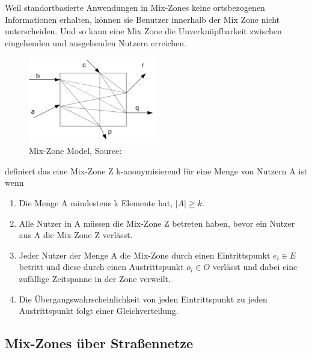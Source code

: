 Weil standortbasierte Anwendungen in Mix-Zones keine ortsbezogenen Informationen erhalten, können sie Benutzer innerhalb der Mix Zone nicht unterscheiden. Und so kann eine Mix Zone die Unverknüpfbarkeit zwischen  eingehenden und ausgehenden Nutzern erreichen.

\begin{figure}[!h]
		\centering
		\includegraphics[width=0.5\textwidth]{Bilder/MixZone.PNG}
		\caption{Mix-Zone Model, Source: \protect\cite{Palanisamy2011}}
		\label{fig_Palanisamy2011}
	\end{figure}

\cite{Palanisamy2011} definiert das eine Mix-Zone Z k-anonymisierend  für eine Menge von Nutzern A ist wenn
\begin{enumerate}
\item Die Menge A mindestens k Elemente hat, $ |A| \geq k $.
\item Alle Nutzer in A müssen die Mix-Zone Z betreten haben, bevor ein Nutzer aus A die Mix-Zone Z verlässt.
\item Jeder Nutzer  der Menge A die Mix-Zone durch einen Eintrittspunkt $ e_{i} \in E $ betritt und diese durch einen Austrittspunkt $ o_{i} \in O $ verlässt und dabei eine zufällige Zeitspanne in der Zone verweilt.
\item Die Übergangswahrscheinlichkeit von jeden Eintrittspunkt zu jeden Austrittspunkt folgt einer Gleichverteilung.
\end{enumerate}

 \subsection{Mix-Zones über Straßennetze}
 
